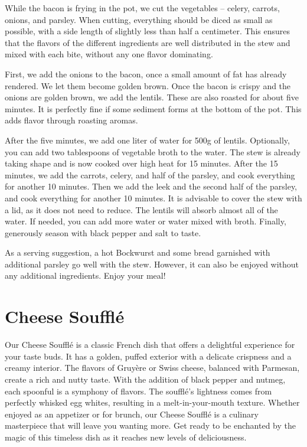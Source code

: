 While the bacon is frying in the pot, we cut the vegetables -- celery, carrots, onions, and parsley. When cutting, everything should be diced as small as possible, with a side length of slightly less than half a centimeter. This ensures that the flavors of the different ingredients are well distributed in the stew and mixed with each bite, without any one flavor dominating.

First, we add the onions to the bacon, once a small amount of fat has already rendered. We let them become golden brown. Once the bacon is crispy and the onions are golden brown, we add the lentils. These are also roasted for about five minutes. It is perfectly fine if some sediment forms at the bottom of the pot. This adds flavor through roasting aromas.

After the five minutes, we add one liter of water for 500g of lentils. Optionally, you can add two tablespoons of vegetable broth to the water. The stew is already taking shape and is now cooked over high heat for 15 minutes. After the 15 minutes, we add the carrots, celery, and half of the parsley, and cook everything for another 10 minutes. Then we add the leek and the second half of the parsley, and cook everything for another 10 minutes. It is advisable to cover the stew with a lid, as it does not need to reduce. The lentils will absorb almost all of the water. If needed, you can add more water or water mixed with broth. Finally, generously season with black pepper and salt to taste.

As a serving suggestion, a hot Bockwurst and some bread garnished with additional parsley go well with the stew. However, it can also be enjoyed without any additional ingredients. Enjoy your meal!

\section{Cheese Soufflé}
\label{cheesesouffle}
Our Cheese Soufflé is a classic French dish that offers a delightful experience for your taste buds. It has a golden, puffed exterior with a delicate crispness and a creamy interior. The flavors of Gruyère or Swiss cheese, balanced with Parmesan, create a rich and nutty taste. With the addition of black pepper and nutmeg, each spoonful is a symphony of flavors. The soufflé's lightness comes from perfectly whisked egg whites, resulting in a melt-in-your-mouth texture. Whether enjoyed as an appetizer or for brunch, our Cheese Soufflé is a culinary masterpiece that will leave you wanting more. Get ready to be enchanted by the magic of this timeless dish as it reaches new levels of deliciousness.

